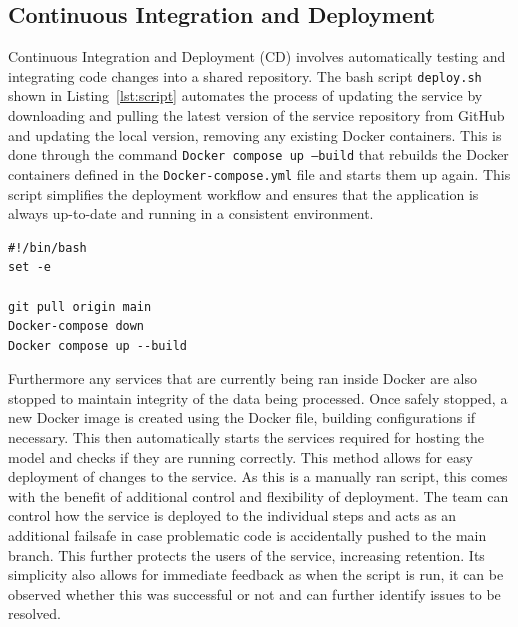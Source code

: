 \documentclass{surreydissertation}
\begin{document}
\subsection{Continuous Integration and Deployment}
Continuous Integration and Deployment (CD) involves automatically testing and integrating code changes into a shared repository. The bash script \texttt{deploy.sh} shown in  Listing~\ref{lst:script}  automates the process of updating the service by downloading and pulling the latest version of the service repository from GitHub and updating the local version, removing any existing Docker containers.  This is done through the command \texttt{Docker compose up --build} that rebuilds the Docker containers defined in the \texttt{Docker-compose.yml} file and starts them up again. This script simplifies the deployment workflow and ensures that the application is always up-to-date and running in a consistent environment.


\begin{lstlisting}[style=bash, caption={\texttt{deploy.sh} Bash Script}, label={lst:script}]
#!/bin/bash
set -e

git pull origin main
Docker-compose down
Docker compose up --build
\end{lstlisting}

Furthermore any services that are currently being ran inside Docker are also stopped to maintain integrity of the data being processed. Once safely stopped, a new Docker image is created using the Docker file, building configurations if necessary. This then automatically starts the services required for hosting the model and checks if they are running correctly. This method allows for easy deployment of changes to the service. As this is a manually ran script, this comes with the benefit of additional control and flexibility of deployment. The team can control how the service is deployed to the individual steps and acts as an additional failsafe in case problematic code is accidentally pushed to the main branch. This further protects the users of the service, increasing retention. Its simplicity also allows for immediate feedback as when the script is run, it can be observed whether
 this was successful or not and can further identify issues to be resolved. 
\end{document}
